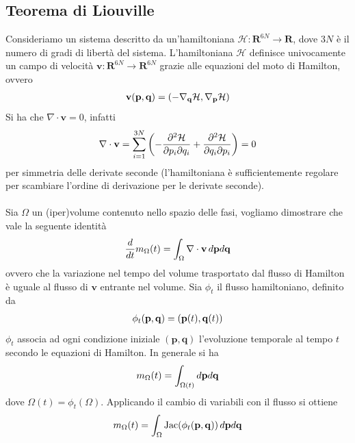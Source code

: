 \documentclass{article}
\begin{document}
\subsection*{Teorema di Liouville}
Consideriamo un sistema descritto da un'hamiltoniana $\mathcal{H} : \mathbf{R}^{6N} \longrightarrow \mathbf{R}$, dove $3N$ è il numero di gradi di libertà del sistema. L'hamiltoniana $\mathcal{H}$ definisce univocamente un campo di velocità $\mathbf{v} : \mathbf{R}^{6N} \longrightarrow \mathbf{R}^{6N}$ grazie alle equazioni del moto di Hamilton, ovvero
\begin{gather}
    \mathbf{v}(\mathbf{p}, \mathbf{q}) = \left(-\nabla_\mathbf{q}\mathcal{H}, \nabla_\mathbf{p}\mathcal{H}\right) \notag
\end{gather}
Si ha che $\nabla \cdot \mathbf{v} = 0$, infatti
\begin{gather}
    \nabla \cdot \mathbf{v} = \sum_{i = 1}^{3N}\left(-\frac{\partial^2 \mathcal{H}}{\partial p_i \partial q_i} + \frac{\partial^2 \mathcal{H}}{\partial q_i \partial p_i}\right) = 0 \notag
\end{gather}
per simmetria delle derivate seconde (l'hamiltoniana è sufficientemente regolare per scambiare l'ordine di derivazione per le derivate seconde). \\ \\
Sia $\Omega$ un (iper)volume contenuto nello spazio delle fasi, vogliamo dimostrare che vale la seguente identità
\begin{gather}
    \frac{d}{dt}m_{\Omega}(t) = \int_{\Omega} \nabla \cdot \mathbf{v} \, d\mathbf{p}d\mathbf{q} \notag
\end{gather}
ovvero che la variazione nel tempo del volume trasportato dal flusso di Hamilton è uguale al flusso di $\mathbf{v}$ entrante nel volume. Sia $\phi_t$ il flusso hamiltoniano, definito da
\begin{gather}
    \phi_t(\mathbf{p}, \mathbf{q}) = (\mathbf{p}(t), \mathbf{q}(t)) \notag
\end{gather}
$\phi_t$ associa ad ogni condizione iniziale $(\mathbf{p}, \mathbf{q})$ l'evoluzione temporale al tempo $t$ secondo le equazioni di Hamilton. In generale si ha
\begin{gather}
    m_\Omega(t) = \int_{\Omega(t)} d\mathbf{p}d\mathbf{q} \notag
\end{gather}
dove $\Omega(t) = \phi_t(\Omega)$. Applicando il cambio di variabili con il flusso si ottiene
\begin{gather}
    m_\Omega(t) = \int_\Omega \mathrm{Jac}(\phi_t(\mathbf{p}, \mathbf{q})) \, d\mathbf{p}d\mathbf{q} \notag
\end{gather}
\end{document}
